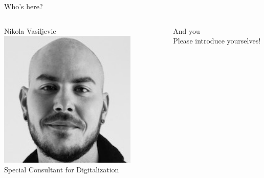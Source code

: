 \begin{frame}{Who's here?}
\begin{columns}[t]
        \begin{column}{.3\textwidth}
            \begin{block}{Nikola Vasiljevic}
            \centering
            \includegraphics[width=0.8\textwidth]{images/Vasiljevic_Headshot.png}\\
            Special Consultant for Digitalization \\
            \end{block}
        \end{column}
        
        \begin{column}{.3\textwidth}
            \begin{block}{And you}
            \centering
            {\fontsize{100}{120}\selectfont\faUsers}\\
            Please introduce yourselves!
            \end{block}
        \end{column}
    \end{columns}

\end{frame}


